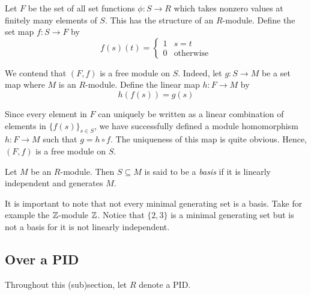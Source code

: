 Let $F$ be the set of all set functions $\phi: S\to R$ which takes nonzero values at finitely many elements of $S$. This has the structure of an $R$-module. Define the set map $f: S\to F$ by 
\begin{equation*}
    f(s)(t) = 
    \begin{cases}
        1 & s = t\\
        0 & \text{otherwise}
    \end{cases}
\end{equation*}

We contend that $(F,f)$ is a free module on $S$. Indeed, let $g: S\to M$ be a set map where $M$ is an $R$-module. Define the linear map $h: F\to M$ by 
\begin{equation*}
    h(f(s)) = g(s)
\end{equation*}

Since every element in $F$ can uniquely be written as a linear combination of elements in $\{f(s)\}_{s\in S}$, we have successfully defined a module homomorphism $h: F\to M$ such that $g = h\circ f$. The uniqueness of this map is quite obvious. Hence, $(F,f)$ is a free module on $S$.

\begin{definition}[Basis]
    Let $M$ be an $R$-module. Then $S\subseteq M$ is said to be a \textit{basis} if it is linearly independent and generates $M$.
\end{definition}

It is important to note that not every minimal generating set is a basis. Take for example the $\mathbb{Z}$-module $\mathbb{Z}$. Notice that $\{2,3\}$ is a minimal generating set but is not a basis for it is not linearly independent.

\subsection{Over a PID}

Throughout this (sub)section, let $R$ denote a PID.

